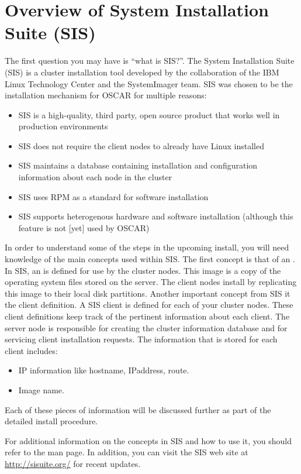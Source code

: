%
%
%

\section{Overview of System Installation Suite (SIS)}
\label{sec:sis}

The first question you may have is ``what is SIS?''. The System
Installation Suite (SIS) is a cluster installation tool developed by
the collaboration of the IBM Linux Technology Center and the
SystemImager team.  SIS was chosen to be the installation mechanism
for OSCAR for multiple reasons:

\begin{itemize}
\item SIS is a high-quality, third party, open source product that
  works well in production environments

\item SIS does not require the client nodes to already have Linux
  installed
  
\item SIS maintains a database containing installation and
  configuration information about each node in the cluster

\item SIS uses RPM as a standard for software installation
  
\item SIS supports heterogenous hardware and software installation
  (although this feature is not [yet] used by OSCAR)
\end{itemize}

In order to understand some of the steps in the upcoming install, you
will need knowledge of the main concepts used within SIS. The first
concept is that of an . In SIS, an  is defined
for use by the cluster nodes. This image is a copy of the operating
system files stored on the server. The client nodes install by
replicating this image to their local disk partitions. Another
important concept from SIS it the client definition.  A SIS client is
defined for each of your cluster nodes.  These client definitions keep
track of the pertinent information about each client.  The server node
is responsible for creating the cluster information database and for
servicing client installation requests.  The information that is
stored for each client includes:

\begin{itemize}
\item IP information like hostname, IPaddress, route.
\item Image name.
\end{itemize}

Each of these pieces of information will be discussed further as part
of the detailed install procedure.

For additional information on the concepts in SIS and how to use it,
you should refer to the  man page.  In addition, you can
visit the SIS web site at \url{http://sisuite.org/} for recent
updates.

